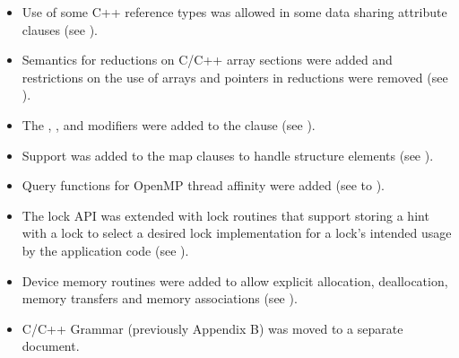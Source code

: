 \begin{itemize}
\item Use of some C++ reference types was allowed in some data sharing
      attribute clauses (see ).

\item Semantics for reductions on C/C++ array sections were added and
      restrictions on the use of arrays and pointers in reductions were
      removed (see ).

\item The , , and  modifiers were added to the
       clause (see ).

\item Support was added to the map clauses to handle structure elements
	(see ).

\item Query functions for OpenMP thread affinity were added (see
       to ).

\item The lock API was extended with lock routines that support storing a hint
      with a lock to select a desired lock implementation for a lock's
      intended usage by the application code (see
      ).

\item Device memory routines were added to allow explicit allocation,
      deallocation, memory transfers and memory associations (see
      ).

\item C/C++ Grammar (previously Appendix B) was moved to a separate document.
\end{itemize}



